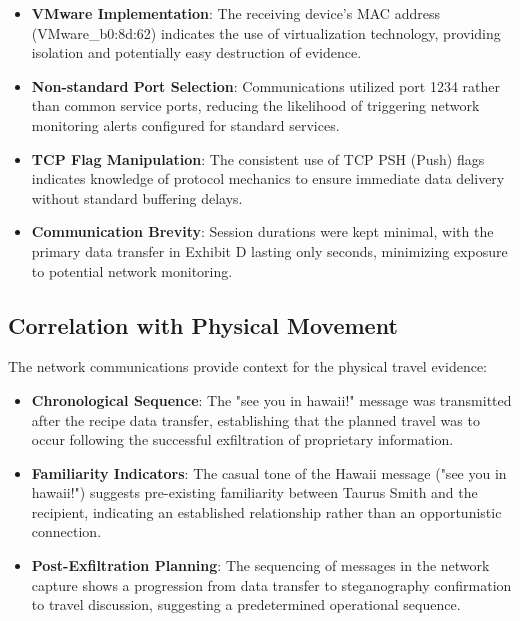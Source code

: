 \begin{itemize}
    \item \textbf{VMware Implementation}: The receiving device's MAC address (VMware\_b0:8d:62) indicates the use of virtualization technology, providing isolation and potentially easy destruction of evidence.
    
    \item \textbf{Non-standard Port Selection}: Communications utilized port 1234 rather than common service ports, reducing the likelihood of triggering network monitoring alerts configured for standard services.
    
    \item \textbf{TCP Flag Manipulation}: The consistent use of TCP PSH (Push) flags indicates knowledge of protocol mechanics to ensure immediate data delivery without standard buffering delays.
    
    \item \textbf{Communication Brevity}: Session durations were kept minimal, with the primary data transfer in Exhibit D lasting only seconds, minimizing exposure to potential network monitoring.
\end{itemize}

\subsection{Correlation with Physical Movement}
The network communications provide context for the physical travel evidence:

\begin{itemize}
    \item \textbf{Chronological Sequence}: The "see you in hawaii!" message was transmitted after the recipe data transfer, establishing that the planned travel was to occur following the successful exfiltration of proprietary information.
    
    \item \textbf{Familiarity Indicators}: The casual tone of the Hawaii message ("see you in hawaii!") suggests pre-existing familiarity between Taurus Smith and the recipient, indicating an established relationship rather than an opportunistic connection.
    
    \item \textbf{Post-Exfiltration Planning}: The sequencing of messages in the network capture shows a progression from data transfer to steganography confirmation to travel discussion, suggesting a predetermined operational sequence.
\end{itemize}

